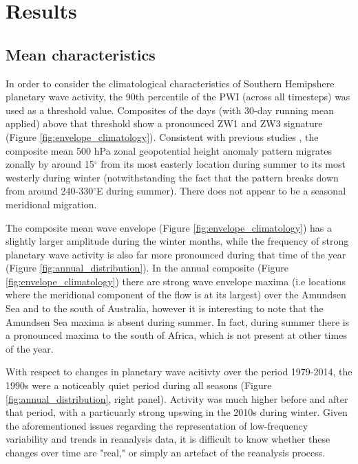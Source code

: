\section{Results}

\subsection{Mean characteristics}

In order to consider the climatological characteristics of Southern Hemipshere planetary wave activity, the 90th percentile of the PWI (across all timesteps) was used as a threshold value. Composites of the days (with 30-day running mean applied) above that threshold show a pronounced ZW1 and ZW3 signature (Figure \ref{fig:envelope_climatology}). Consistent with previous studies \citep{vanLoon1984,Mo1985}, the composite mean 500 hPa zonal geopotential height anomaly pattern migrates zonally by around 15$^{\circ}$ from its most easterly location during summer to its most westerly during winter (notwithstanding the fact that the pattern breaks down from around 240-330$^{\circ}$E during summer). There does not appear to be a seasonal meridional migration.

The composite mean wave envelope (Figure \ref{fig:envelope_climatology}) has a slightly larger amplitude during the winter months, while the frequency of strong planetary wave activity is also far more pronounced during that time of the year (Figure \ref{fig:annual_distribution}). In the annual composite (Figure \ref{fig:envelope_climatology}) there are strong wave envelope maxima (i.e locations where the meridional component of the flow is at its largest) over the Amundsen Sea and to the south of Australia, however it is interesting to note that the Amundsen Sea maxima is absent during summer. In fact, during summer there is a pronounced maxima to the south of Africa, which is not present at other times of the year.

With respect to changes in planetary wave acitivty over the period 1979-2014, the 1990s were a noticeably quiet period during all seasons (Figure \ref{fig:annual_distribution}, right panel). Activity was much higher before and after that period, with a particuarly strong upswing in the 2010s during winter. Given the aforementioned issues regarding the representation of low-frequency variability and trends in reanalysis data, it is difficult to know whether these changes over time are "real," or simply an artefact of the reanalysis process.
